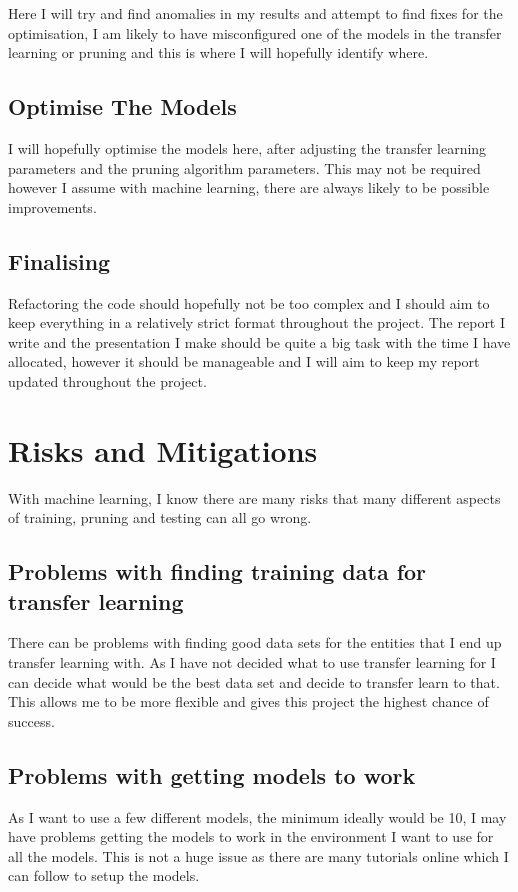 \documentclass{article}
\begin{document}
Here I will try and find anomalies in my results and attempt to find fixes for the optimisation, I am likely to have misconfigured one of the models in the transfer learning or pruning and this is where I will hopefully identify where.

\subsection{Optimise The Models}

I will hopefully optimise the models here, after adjusting the transfer learning parameters and the pruning algorithm parameters. This may not be required however I assume with machine learning, there are always likely to be possible improvements.

\subsection{Finalising}

Refactoring the code should hopefully not be too complex and I should aim to keep everything in a relatively strict format throughout the project. The report I write and the presentation I make should be quite a big task with the time I have allocated, however it should be manageable and I will aim to keep my report updated throughout the project.

\pagebreak
\section{Risks and Mitigations}
With machine learning, I know there are many risks that many different aspects of training, pruning and testing can all go wrong.

\subsection{Problems with finding training data for transfer learning}
There can be problems with finding good data sets for the entities that I end up transfer learning with. As I have not decided what to use transfer learning for I can decide what would be the best data set and decide to transfer learn to that. This allows me to be more flexible and gives this project the highest chance of success.

\subsection{Problems with getting models to work}
As I want to use a few different models, the minimum ideally would be 10, I may have problems getting the models to work in the environment I want to use for all the models. This is not a huge issue as there are many tutorials online which I can follow to setup the models.
\end{document}
